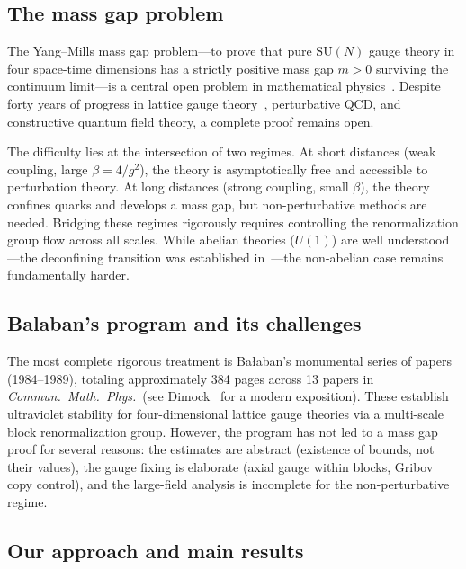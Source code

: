\documentclass[11pt]{article}
\theoremstyle{definition}
\newcommand{\SU}{\mathrm{SU}}
\begin{document}
\subsection{The mass gap problem}

The Yang--Mills mass gap problem---to prove that pure $\SU(N)$ gauge
theory in four space-time dimensions has a strictly positive mass gap
$m>0$ surviving the continuum limit---is a central open problem in
mathematical physics~\cite{JaffeWitten}.
Despite forty years of progress in lattice gauge
theory~\cite{Creutz80,OS73}, perturbative QCD, and constructive
quantum field theory, a complete proof remains open.

The difficulty lies at the intersection of two regimes.  At short
distances (weak coupling, large $\beta=4/g^2$), the theory is
asymptotically free and accessible to perturbation theory.  At long
distances (strong coupling, small $\beta$), the theory confines quarks
and develops a mass gap, but non-perturbative methods are needed.
Bridging these regimes rigorously requires controlling the renormalization
group flow across all scales.  While abelian theories ($U(1)$) are well
understood---the deconfining transition was established
in~\cite{Guth80,FS82}---the non-abelian case remains fundamentally harder.

\subsection{Balaban's program and its challenges}

The most complete rigorous treatment is Ba\l aban's monumental series
of papers~\cite{BalabanI,BalabanII,BalabanIII,BalabanLF1,BalabanLF2}
(1984--1989), totaling approximately 384 pages across 13 papers in
\emph{Commun.\ Math.\ Phys.}\ (see Dimock~\cite{DimockI,DimockII}
for a modern exposition).  These establish ultraviolet stability for
four-dimensional lattice gauge theories via a multi-scale block
renormalization group.  However, the program has not led to a mass gap
proof for several reasons: the estimates are abstract (existence of
bounds, not their values), the gauge fixing is elaborate (axial gauge
within blocks, Gribov copy control), and the large-field analysis is
incomplete for the non-perturbative regime.

\subsection{Our approach and main results}
\end{document}
